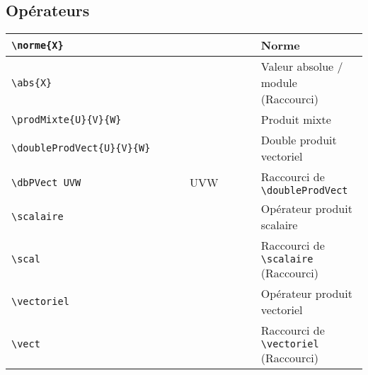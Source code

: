 \documentclass[a4paper,10pt]{article}
\newcommand{\rac}{({\color{red}Raccourci})}
\begin{document}
	\subsection{Opérateurs}
	\noindent
	\begin{tabular}{|p{0.5\linewidth}|p{0.2\linewidth}|p{0.3\linewidth}|}
		\hline
			\verb!\norme{X}!	&	\norme{X}	&	Norme
		\\\hline
			\verb!\abs{X}!		&	\abs{X}		&	Valeur absolue / module \rac
		\\\hline
			\verb!\prodMixte{U}{V}{W}!	&	\prodMixte{U}{V}{W}		&	Produit mixte
		\\\hline
			\verb!\doubleProdVect{U}{V}{W}!		&	\doubleProdVect{U}{V}{W}	&	Double produit vectoriel
		\\\hline
			\verb!\dbPVect UVW!		&	\dbPVect UVW	&	Raccourci de \verb!\doubleProdVect!
		\\\hline
			\verb!\scalaire!			&	\scalaire		&	Opérateur produit scalaire
		\\\hline
			\verb!\scal!				&	\scal			&	Raccourci de \verb!\scalaire! \rac
		\\\hline
			\verb!\vectoriel!			&	\vectoriel		&	Opérateur produit vectoriel
		\\\hline
			\verb!\vect!				&	\vect			&	Raccourci de \verb!\vectoriel! \rac
		\\\hline
	\end{tabular}
\end{document}
